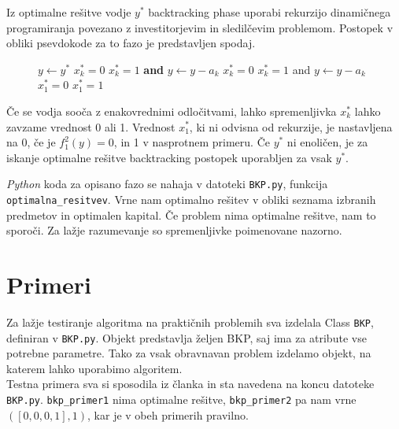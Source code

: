 \documentclass[a4paper, 11pt]{article}
\begin{document}
	Iz optimalne rešitve vodje $y^*$ backtracking phase uporabi rekurzijo dinamičnega programiranja povezano z investitorjevim in sledilčevim problemom. Postopek v obliki psevdokode za to fazo je predstavljen spodaj.

	\begin{figure}[ht]
  	\centering
  		\begin{minipage}{.55\linewidth}
			\begin{algorithmic}[1]
			\STATE $y \leftarrow y^*$
							\STATE $x^*_k = 0$
						\ELSE
							\STATE $x^*_k = 1$ \textbf{and} $y \gets y - a_k$
						\ENDIF
					\ELSE
							\STATE $x^*_k = 0$
						\ELSE
							\STATE $x^*_k = 1$ and $y \gets y - a_k$
						\ENDIF
					\ENDIF
				\ENDFOR
					\STATE $x_1^* = 0$
				\ELSE
					\STATE $x_1^* = 1$
				\ENDIF
			\end{algorithmic}
		\end{minipage}
	\end{figure}
	
	Če se vodja sooča z enakovrednimi odločitvami, lahko spremenljivka $x^*_k$ lahko zavzame vrednost 0 ali 1. Vrednost $x^*_1$, ki ni odvisna od rekurzije, je nastavljena na 0, če je $f_{1}^{2}(y) = 0$, in 1 v nasprotnem primeru. Če $y^*$ ni enoličen, je za iskanje optimalne rešitve backtracking postopek uporabljen za vsak $y^*$.
	
	\textit{Python} koda za opisano fazo se nahaja v datoteki \texttt{BKP.py}, funkcija \texttt{optimalna\_resitvev}. Vrne nam optimalno rešitev v obliki seznama izbranih predmetov in optimalen kapital. Če problem nima optimalne rešitve, nam to sporoči. Za lažje razumevanje so spremenljivke poimenovane nazorno.
	
	\section{Primeri}
	
	Za lažje testiranje algoritma na praktičnih problemih sva izdelala Class \texttt{BKP}, definiran v \texttt{BKP.py}. Objekt predstavlja željen BKP, saj ima za atribute vse potrebne parametre. Tako za vsak obravnavan problem izdelamo objekt, na katerem lahko uporabimo algoritem. \\
	
	Testna primera sva si sposodila iz članka in sta navedena na koncu datoteke \texttt{BKP.py}. \texttt{bkp\_primer1} nima optimalne rešitve, \texttt{bkp\_primer2} pa nam vrne $( [0, 0, 0, 1 ], 1)$, kar je v obeh primerih pravilno.
	
\end{document}
